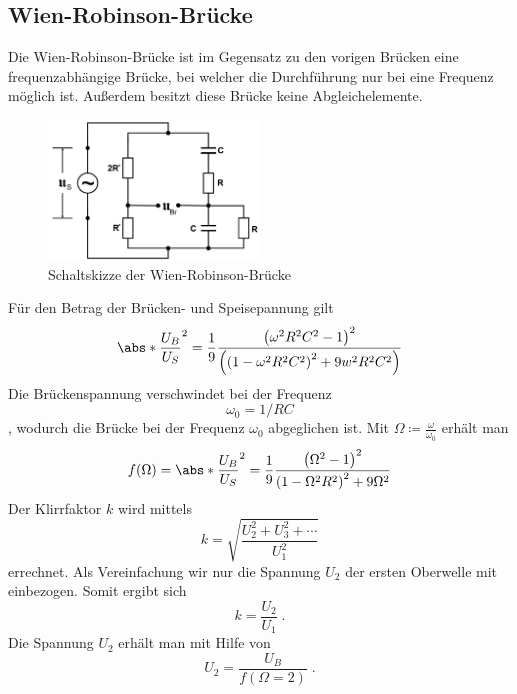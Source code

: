 \subsection{Wien-Robinson-Brücke}
Die Wien-Robinson-Brücke ist im Gegensatz zu den vorigen Brücken eine frequenzabhängige Brücke, bei welcher die Durchführung nur bei eine Frequenz möglich ist.
Außerdem besitzt diese Brücke keine Abgleichelemente.
\begin{figure}
    \centering
    \caption{Schaltskizze der Wien-Robinson-Brücke}
    \label{fig:WR}
    \includegraphics[width=0.5\textwidth]{bridges/WR.png}
\end{figure}
Für den Betrag der Brücken- und Speisepannung gilt
\begin{equation}
    \abs*{\frac{U_B}{U_S}}^2 = \frac{1}{9} \frac{\left(\omega^2 R^2 C^2 -1 \right)^2}{\left( \left( 1 - \omega^2 R^2 C^2 \right)^2 
    + 9 w^2 R^2 C^2 \right)}
\end{equation}
Die Brückenspannung verschwindet bei der Frequenz 
\begin{equation}
    \omega_0 = 1/RC
\end{equation}
, wodurch die Brücke bei der Frequenz $\omega_0$ abgeglichen ist.
Mit $\Omega \coloneq \frac{\omega}{\omega_0}$ erhält man 
\begin{equation}
    f(\Omega) = \abs*{\frac{U_B}{U_S}}^2 = \frac{1}{9} \frac{\left(\Omega^2 -1 \right)^2}{ \left( 1 - \Omega^2 R^2 \right)^2 
    + 9 \Omega^2}
\end{equation}
Der Klirrfaktor $k$ wird mittels
\begin{equation}
    k = \sqrt{\frac{U_2^2 + U_3^2 + \dotsb }{U_1^2}}
\end{equation}
errechnet. Als Vereinfachung wir nur die Spannung $U_2$ der ersten Oberwelle mit einbezogen. Somit ergibt sich
\begin{equation}
    k = \frac{U_2}{U_1} \; \text{.}
\end{equation} 
Die Spannung $U_2$ erhält man mit Hilfe von 
\begin{equation}
    U_2 = \frac{U_B}{f(\Omega = 2)} \; \text{.}
\end{equation}